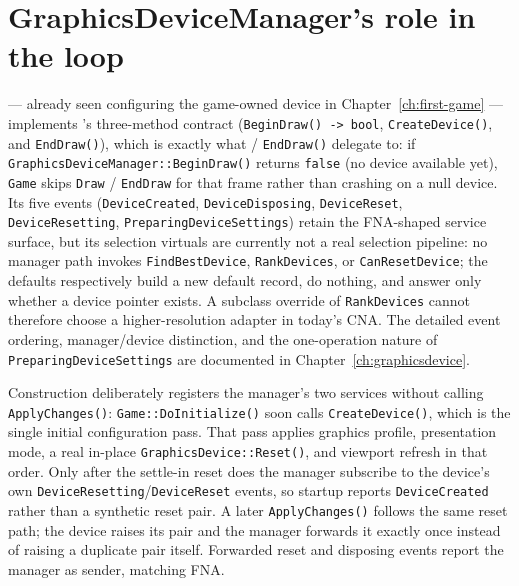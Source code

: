 \section{GraphicsDeviceManager's role in the loop}
\label{sec:graphicsdevicemanager-in-loop}

 --- already seen configuring the game-owned device in
Chapter~\ref{ch:first-game} --- implements 's three-method
contract (\texttt{BeginDraw() -> bool}, \texttt{CreateDevice()}, and \texttt{EndDraw()}),
which is exactly what  / \texttt{EndDraw()} delegate to: if
\texttt{GraphicsDeviceManager::BeginDraw()} returns \texttt{false} (no device available yet),
\texttt{Game} skips \texttt{Draw} / \texttt{EndDraw} for that frame rather than crashing on a
null device. Its five events (\texttt{DeviceCreated}, \texttt{DeviceDisposing},
\texttt{DeviceReset}, \texttt{DeviceResetting}, \texttt{PreparingDeviceSettings}) retain the
FNA-shaped service surface, but its selection virtuals are currently not a real selection
pipeline: no manager path invokes \texttt{FindBestDevice}, \texttt{RankDevices}, or
\texttt{CanResetDevice}; the defaults respectively build a new default record, do nothing, and
answer only whether a device pointer exists. A subclass override of \texttt{RankDevices} cannot
therefore choose a higher-resolution adapter in today's CNA. The detailed event ordering,
manager/device distinction, and the one-operation nature of \texttt{PreparingDeviceSettings}
are documented in Chapter~\ref{ch:graphicsdevice}.

Construction deliberately registers the manager's two services without calling
\texttt{ApplyChanges()}: \texttt{Game::DoInitialize()} soon calls \texttt{CreateDevice()}, which
is the single initial configuration pass. That pass applies graphics profile, presentation mode,
a real in-place \texttt{GraphicsDevice::Reset()}, and viewport refresh in that order. Only after
the settle-in reset does the manager subscribe to the device's own
\texttt{DeviceResetting}/\texttt{DeviceReset} events, so startup reports \texttt{DeviceCreated}
rather than a synthetic reset pair. A later \texttt{ApplyChanges()} follows the same reset path;
the device raises its pair and the manager forwards it exactly once instead of raising a duplicate
pair itself. Forwarded reset and disposing events report the manager as sender, matching FNA.


